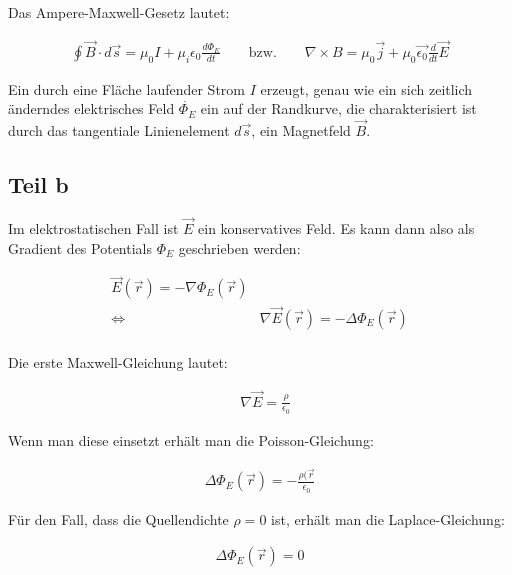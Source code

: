 \documentclass[a4paper,german,12pt,smallheadings]{scrartcl}
\begin{document}
Das Ampere-Maxwell-Gesetz lautet:

\begin{align*}
  \oint \vec{B} \cdot d\vec{s} = \mu_0 I + \mu_i \epsilon_0 \frac{d\Phi_{E}}{dt} \qquad\text{bzw.}\qquad \nabla \times B = \mu_0 \vec{j} + \mu_0 \vec{\epsilon_0} \frac{d}{dt} \vec{E}
\end{align*}

Ein durch eine Fläche laufender Strom $I$ erzeugt, genau wie ein sich zeitlich
änderndes elektrisches Feld $\dot{\Phi_{E}}$ ein auf der Randkurve, die
charakterisiert ist durch das tangentiale Linienelement $d\vec{s}$, ein
Magnetfeld $\vec{B}$.

\subsection*{Teil b}

Im elektrostatischen Fall ist $\vec{E}$ ein konservatives Feld. Es kann dann
also als Gradient des Potentials $\Phi_{E}$ geschrieben werden:

\begin{align*}
  \vec{E}(\vec{r}) = -\nabla \Phi_{E}(\vec{r}) \\
  \Leftrightarrow\quad&\nabla \vec{E}(\vec{r}) = -\Delta \Phi_{E}(\vec{r}) \\
\end{align*}

Die erste Maxwell-Gleichung lautet:

\begin{align*}
  &\nabla \vec{E} = \frac{\rho}{\epsilon_0}
\end{align*}

Wenn man diese einsetzt erhält man die Poisson-Gleichung:

\begin{align*}
  \Delta \Phi_{E}(\vec{r}) = -\frac{\rho(\vec{r}}{\epsilon_0}
\end{align*}

Für den Fall, dass die Quellendichte $\rho = 0$ ist, erhält man die
Laplace-Gleichung:

\begin{align*}
  \Delta \Phi_{E}(\vec{r}) = 0
\end{align*}
\end{document}
